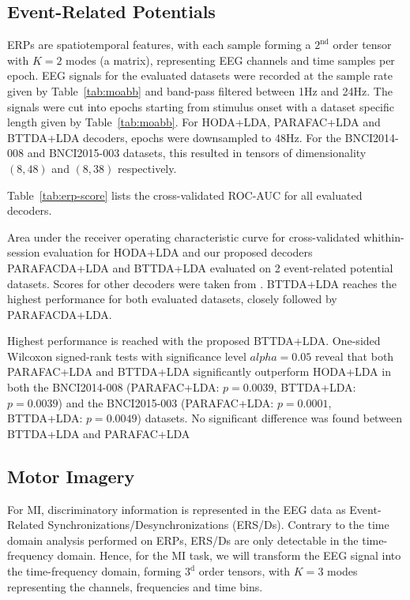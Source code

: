 \documentclass[twocolumn]{article}
\begin{document}
\subsection{Event-Related Potentials}
ERPs are spatiotemporal features, with each sample forming a $2^\text{nd}$
order tensor with $K=2$ modes (a matrix), representing EEG channels and time samples
per epoch.
EEG signals for the evaluated datasets were recorded at the sample rate given
by Table~\ref{tab:moabb} and band-pass filtered between 1Hz
and 24Hz.
The signals were cut into epochs starting from stimulus onset with a
dataset specific length given by Table~\ref{tab:moabb}.
For HODA+LDA, PARAFAC+LDA and BTTDA+LDA decoders, epochs were downsampled to 48Hz.
For the BNCI2014-008 and BNCI2015-003 datasets, this resulted in tensors of
dimensionality $(8,48)$ and $(8,38)$ respectively.

Table~\ref{tab:erp-score} lists the cross-validated ROC-AUC for all evaluated
decoders.
\begin{table}[t]
	\centering
	\footnotesize
	\centering
	
	\caption{Area under the receiver operating characteristic curve for
		cross-validated whithin-session evaluation for HODA+LDA and our proposed decoders
		PARAFACDA+LDA and BTTDA+LDA evaluated on 2 event-related potential datasets.
		Scores for other decoders were taken from \cite{Chevallier2024}.
		BTTDA+LDA reaches the highest performance for both evaluated datasets, closely
		followed by PARAFACDA+LDA.
	}
	\label{tab:erp-score}
\end{table}
Highest performance is reached with the proposed BTTDA+LDA.
One-sided Wilcoxon signed-rank tests with significance level $alpha=0.05$ reveal that both PARAFAC+LDA and BTTDA+LDA
significantly outperform HODA+LDA in both the BNCI2014-008 (PARAFAC+LDA:
$p=0.0039$, BTTDA+LDA: $p=0.0039$) and the BNCI2015-003 (PARAFAC+LDA:
$p=0.0001$, BTTDA+LDA: $p=0.0049$) datasets.
No significant difference was found between BTTDA+LDA and PARAFAC+LDA

\subsection{Motor Imagery}
For MI, discriminatory information is represented in the EEG data as
Event-Related Synchronizations/Desynchronizations (ERS/Ds).
Contrary to the time domain analysis performed on ERPs, ERS/Ds are only
detectable in the time-frequency domain.
Hence, for the MI task, we will transform the EEG signal into the
time-frequency domain, forming $3^\text{d}$ order tensors, with $K=3$ modes
representing the channels, frequencies and time bins.
\end{document}

